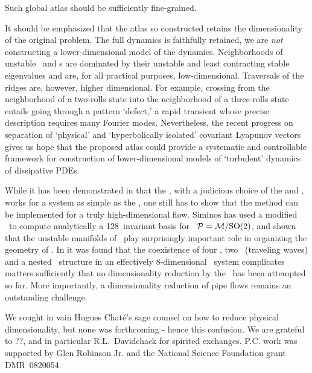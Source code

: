 Such global atlas should be sufficiently fine-grained.

It should be emphasized that the atlas so constructed retains the
dimensionality of the original problem. The full dynamics is faithfully
retained, we are \emph{not} constructing a lower-dimensional model of the
dynamics. Neighborhoods of unstable \eqva\ and \po s are dominated by
their unstable and least contracting stable eigenvalues and are, for all
practical purposes, low-dimensional. Traversals of the ridges are,
however, higher dimensional. For example, crossing from the neighborhood
of a two-rolls state into the neighborhood of a three-rolls state entails
going through a pattern `defect,' a rapid transient whose precise
description requires many Fourier modes. Nevertheless, the recent
progress on separation of `physical' and `hyperbolically isolated'
covariant Lyapunov
vectors gives us
hope that the proposed atlas could provide a systematic and controllable
framework for construction of lower-dimensional models of `turbulent'
dynamics of dissipative PDEs.

While it has been demonstrated in   that the \mframes, with a judicious choice of the {\template} and {\PoincSec}, works for a system as simple as the \cLf, one still has to show that the method can be implemented for a truly high-dimensional flow. Siminos has used a modified \mframes\ to compute analytically a 128\dmn\ invariant basis for \reducedsp\ ${\cal P} = {\cal M}/\textrm{SO}(2)$, and shown that the unstable manifolds of \reqva\ play surprisingly important role in organizing the geometry of \KS. In  it was found that the coexistence of four \eqva, two \reqva\ (traveling waves) and a nested \fixedsp\ structure in an effectively $8$-dimensional \KS\ system complicates matters sufficiently that no dimensionality reduction by the \mslices\ has been attempted so far. More importantly, a dimensionality reduction of pipe flows remains an outstanding challenge.


	\medskip
We sought in vain Hugues Chat\'e's sage counsel on how to reduce
physical dimensionality, but none was forthcoming - hence this
confusion.
We are grateful to
??,
and in particular R.L.~Davidchack
for spirited exchanges.
P.C. work was supported by  Glen Robinson Jr.
and the National Science Foundation grant
DMR~0820054. 	



